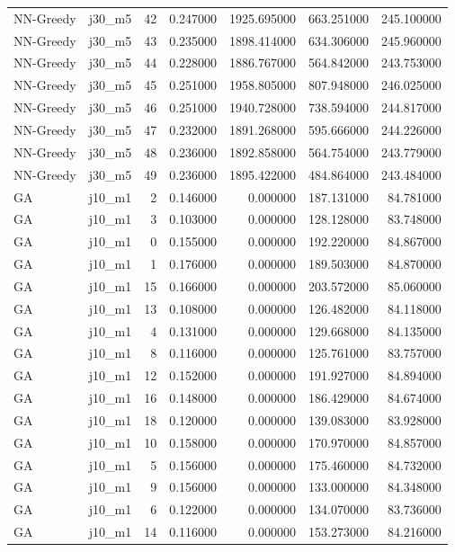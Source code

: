 \begin{tabular}{llrrrrr}
NN-Greedy & j30_m5 & 42 & 0.247000 & 1925.695000 & 663.251000 & 245.100000 \\
NN-Greedy & j30_m5 & 43 & 0.235000 & 1898.414000 & 634.306000 & 245.960000 \\
NN-Greedy & j30_m5 & 44 & 0.228000 & 1886.767000 & 564.842000 & 243.753000 \\
NN-Greedy & j30_m5 & 45 & 0.251000 & 1958.805000 & 807.948000 & 246.025000 \\
NN-Greedy & j30_m5 & 46 & 0.251000 & 1940.728000 & 738.594000 & 244.817000 \\
NN-Greedy & j30_m5 & 47 & 0.232000 & 1891.268000 & 595.666000 & 244.226000 \\
NN-Greedy & j30_m5 & 48 & 0.236000 & 1892.858000 & 564.754000 & 243.779000 \\
NN-Greedy & j30_m5 & 49 & 0.236000 & 1895.422000 & 484.864000 & 243.484000 \\
GA & j10_m1 & 2 & 0.146000 & 0.000000 & 187.131000 & 84.781000 \\
GA & j10_m1 & 3 & 0.103000 & 0.000000 & 128.128000 & 83.748000 \\
GA & j10_m1 & 0 & 0.155000 & 0.000000 & 192.220000 & 84.867000 \\
GA & j10_m1 & 1 & 0.176000 & 0.000000 & 189.503000 & 84.870000 \\
GA & j10_m1 & 15 & 0.166000 & 0.000000 & 203.572000 & 85.060000 \\
GA & j10_m1 & 13 & 0.108000 & 0.000000 & 126.482000 & 84.118000 \\
GA & j10_m1 & 4 & 0.131000 & 0.000000 & 129.668000 & 84.135000 \\
GA & j10_m1 & 8 & 0.116000 & 0.000000 & 125.761000 & 83.757000 \\
GA & j10_m1 & 12 & 0.152000 & 0.000000 & 191.927000 & 84.894000 \\
GA & j10_m1 & 16 & 0.148000 & 0.000000 & 186.429000 & 84.674000 \\
GA & j10_m1 & 18 & 0.120000 & 0.000000 & 139.083000 & 83.928000 \\
GA & j10_m1 & 10 & 0.158000 & 0.000000 & 170.970000 & 84.857000 \\
GA & j10_m1 & 5 & 0.156000 & 0.000000 & 175.460000 & 84.732000 \\
GA & j10_m1 & 9 & 0.156000 & 0.000000 & 133.000000 & 84.348000 \\
GA & j10_m1 & 6 & 0.122000 & 0.000000 & 134.070000 & 83.736000 \\
GA & j10_m1 & 14 & 0.116000 & 0.000000 & 153.273000 & 84.216000 \\

\end{tabular}
